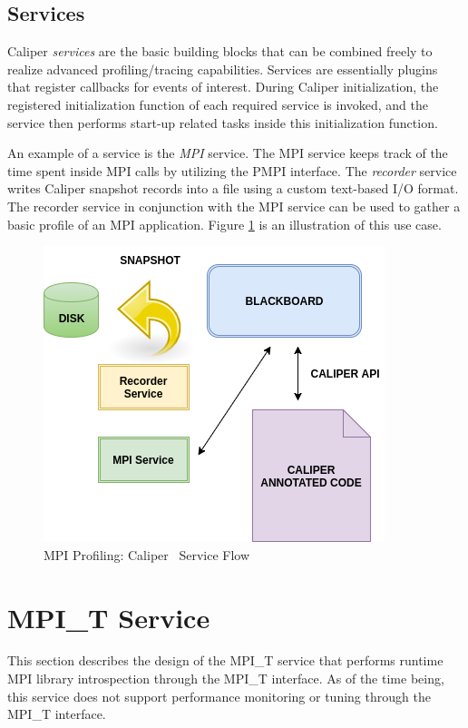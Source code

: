 \subsection{Services}
Caliper \emph{services} are the basic building blocks that can be combined freely to realize advanced profiling/tracing capabilities. Services are essentially plugins that register callbacks for events of interest. During Caliper initialization, the registered initialization function of each required service is invoked, and the service then performs start-up related tasks inside this initialization function. 
\par An example of a service is the \textit{MPI} service. The MPI service keeps track of the time spent inside MPI calls by utilizing the PMPI interface. The \textit{recorder} service writes Caliper snapshot records into a file using a custom text-based I/O format. The recorder service in conjunction with the MPI service can be used to gather a basic profile of an MPI application. Figure \ref{fig:caliservices} is an illustration of this use case. 
\begin{center}
	\begin{figure}[bp!]
         \centering
		\includegraphics[scale=0.7, keepaspectratio]{figures/cali-services}
		\caption{MPI Profiling: Caliper~\cite{CALIPER} Service Flow}
		\label{fig:caliservices}
	\end{figure}
\end{center}


\section {MPI\_T Service}
This section describes the design of the MPI\_T service that performs runtime MPI library introspection through the MPI\_T interface. As of the time being, this service does not support performance monitoring or tuning through the MPI\_T interface. 

